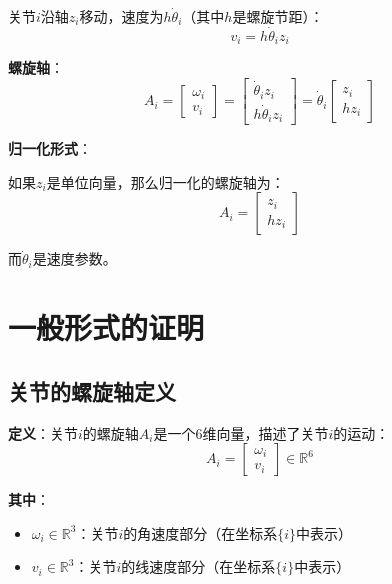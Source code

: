 \documentclass[12pt,a4paper]{article}
\begin{document}
关节$i$沿轴$z_i$移动，速度为$h \dot{\theta}_i$（其中$h$是螺旋节距）：
\begin{equation}
v_i = h \dot{\theta}_i z_i
\end{equation}

\textbf{螺旋轴}：
\begin{equation}
A_i = \begin{bmatrix} \omega_i \\ v_i \end{bmatrix} = \begin{bmatrix} \dot{\theta}_i z_i \\ h \dot{\theta}_i z_i \end{bmatrix} = \dot{\theta}_i \begin{bmatrix} z_i \\ h z_i \end{bmatrix}
\end{equation}

\textbf{归一化形式}：

如果$z_i$是单位向量，那么归一化的螺旋轴为：
\begin{equation}
A_i = \begin{bmatrix} z_i \\ h z_i \end{bmatrix}
\end{equation}

而$\dot{\theta}_i$是速度参数。

\section{一般形式的证明}

\subsection{关节的螺旋轴定义}

\textbf{定义}：关节$i$的螺旋轴$A_i$是一个6维向量，描述了关节$i$的运动：
\begin{equation}
A_i = \begin{bmatrix} \omega_i \\ v_i \end{bmatrix} \in \mathbb{R}^6
\end{equation}

\textbf{其中}：
\begin{itemize}
\item $\omega_i \in \mathbb{R}^3$：关节$i$的角速度部分（在坐标系$\{i\}$中表示）
\item $v_i \in \mathbb{R}^3$：关节$i$的线速度部分（在坐标系$\{i\}$中表示）
\end{itemize}
\end{document}
